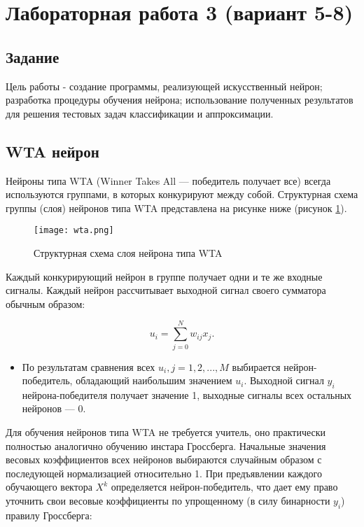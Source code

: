 \section{Лабораторная работа 3 (вариант 5-8)}

\subsection{Задание}
Цель работы - создание программы, реализующей искусственный нейрон; разработка процедуры обучения нейрона; использование полученных результатов для решения тестовых задач классификации и аппроксимации.

\subsection{WTA нейрон}
Нейроны типа WTA (Winner Takes All — победитель получает все) всегда используются группами, в которых конкурируют между собой. Структурная схема группы (слоя) нейронов типа WTA представлена на рисунке ниже (рисунок \ref{img:wta}).

\begin{figure}[H]
\centering
\texttt{[image: wta.png]}
\caption{Структурная схема слоя нейрона типа WTA}
\label{img:wta}
\end{figure}

Каждый конкурирующий нейрон в группе получает одни и те же входные сигналы. Каждый нейрон рассчитывает выходной сигнал своего сумматора обычным образом:

\begin{equation}\label{eq:Func}
	u_i=\sum\limits_{j=0}^N w_{ij} x_j.
\end{equation}

\begin{itemize}
\item По результатам сравнения всех $u_i, j=1, 2, ..., M$ выбирается нейрон-победитель, обладающий наибольшим значением $u_i$. Выходной сигнал $y_i$ нейрона-победителя получает значение 1, выходные сигналы всех остальных нейронов — 0.
\end{itemize}

Для обучения нейронов типа WTA не требуется учитель, оно практически полностью аналогично обучению инстара Гроссберга. Начальные значения весовых коэффициентов всех нейронов выбираются случайным образом с последующей нормализацией относительно 1.
При предъявлении каждого обучающего вектора $X^k$ определяется нейрон-победитель, что дает ему право уточнить свои весовые коэффициенты по упрощенному (в силу бинарности $y_i$) правилу Гроссберга:

